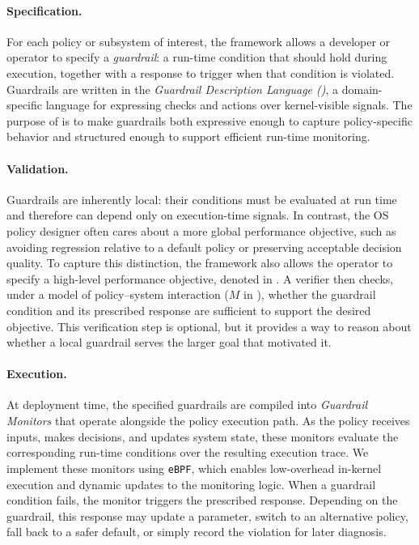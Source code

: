 \paragraph{Specification.}
For each policy or subsystem of interest, the framework allows a developer or operator to specify a \emph{guardrail}: a run-time condition that should hold during execution, together with a response to trigger when that condition is violated. Guardrails are written in the \emph{Guardrail Description Language (\lang)}, a domain-specific language for expressing checks and actions over kernel-visible signals. The purpose of \lang is to make guardrails both expressive enough to capture policy-specific behavior and structured enough to support efficient run-time monitoring.

\paragraph{Validation.}
Guardrails are inherently local: their conditions must be evaluated at run time and therefore can depend only on execution-time signals. In contrast, the OS policy designer often cares about a more global performance objective, such as avoiding regression relative to a default policy or preserving acceptable decision quality. To capture this distinction, the framework also allows the operator to specify a high-level performance objective, denoted \perfsafety in .
A verifier then checks, under a model of policy--system interaction ($M$ in ), whether the guardrail condition and its prescribed response are sufficient to support the desired \perfsafety objective. This verification step is optional, but it provides a way to reason about whether a local guardrail serves the larger goal that motivated it.

\paragraph{Execution.}
At deployment time, the specified guardrails are compiled into \emph{Guardrail Monitors} that operate alongside the policy execution path. As the policy receives inputs, makes decisions, and updates system state, these monitors evaluate the corresponding run-time conditions over the resulting execution trace. We implement these monitors using \texttt{eBPF}, which enables low-overhead in-kernel execution and dynamic updates to the monitoring logic. When a guardrail condition fails, the monitor triggers the prescribed response. Depending on the guardrail, this response may update a parameter, switch to an alternative policy, fall back to a safer default, or simply record the violation for later diagnosis.


